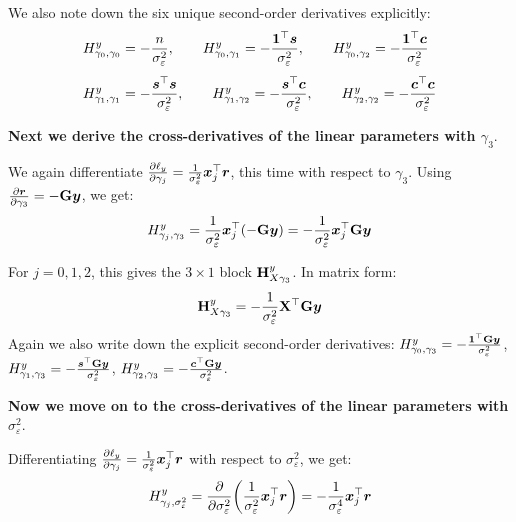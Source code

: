 We also note down the six unique second-order derivatives explicitly:
\begin{align}
    H^y_{\gamma_0,\gamma_0} &= -\frac{n}{\sigma_\varepsilon^2}, \qquad
    H^y_{\gamma_0,\gamma_1} = -\frac{\bm{1}^\top\bm{s}}{\sigma_\varepsilon^2}, \qquad
    H^y_{\gamma_0,\gamma_2} = -\frac{\bm{1}^\top\bm{c}}{\sigma_\varepsilon^2} \\[4pt]
    H^y_{\gamma_1,\gamma_1} &= -\frac{\bm{s}^\top\bm{s}}{\sigma_\varepsilon^2}, \qquad
    H^y_{\gamma_1,\gamma_2} = -\frac{\bm{s}^\top\bm{c}}{\sigma_\varepsilon^2}, \qquad
    H^y_{\gamma_2,\gamma_2} = -\frac{\bm{c}^\top\bm{c}}{\sigma_\varepsilon^2}
\end{align}

\textbf{Next we derive the cross-derivatives of the linear parameters with $\gamma_3$}.

We again differentiate $\frac{\partial \ell_y}{\partial \gamma_j} = \frac{1}{\sigma_\varepsilon^2}\bm{x}_j^\top\bm{r}$, this time with respect to $\gamma_3$. Using $\frac{\partial \bm{r}}{\partial \gamma_3} = -\mathbf{G}\bm{y}$, we get:
\begin{equation}
    H^y_{\gamma_j,\gamma_3} = \frac{1}{\sigma_\varepsilon^2}\bm{x}_j^\top(-\mathbf{G}\bm{y}) = -\frac{1}{\sigma_\varepsilon^2}\bm{x}_j^\top\mathbf{G}\bm{y}
\end{equation}

For $j = 0, 1, 2$, this gives the $3 \times 1$ block $\mathbf{H}^y_{X\gamma_3}$. In matrix form:
\begin{equation}
    \mathbf{H}^y_{X\gamma_3} = -\frac{1}{\sigma_\varepsilon^2}\mathbf{X}^\top\mathbf{G}\bm{y}
\end{equation}
Again we also write down the explicit second-order derivatives: $H^y_{\gamma_0,\gamma_3} = -\frac{\bm{1}^\top\mathbf{G}\bm{y}}{\sigma_\varepsilon^2}$, \; $H^y_{\gamma_1,\gamma_3} = -\frac{\bm{s}^\top\mathbf{G}\bm{y}}{\sigma_\varepsilon^2}$, \; $H^y_{\gamma_2,\gamma_3} = -\frac{\bm{c}^\top\mathbf{G}\bm{y}}{\sigma_\varepsilon^2}$.

\textbf{Now we move on to the cross-derivatives of the linear parameters with $\sigma_\varepsilon^2$}.

Differentiating $\frac{\partial \ell_y}{\partial \gamma_j} = \frac{1}{\sigma_\varepsilon^2}\bm{x}_j^\top\bm{r}$ with respect to $\sigma_\varepsilon^2$, we get:
\begin{equation}
    H^y_{\gamma_j,\sigma_\varepsilon^2} = \frac{\partial}{\partial \sigma_\varepsilon^2}\!\left(\frac{1}{\sigma_\varepsilon^2}\bm{x}_j^\top\bm{r}\right) = -\frac{1}{\sigma_\varepsilon^4}\bm{x}_j^\top\bm{r}
\end{equation}

